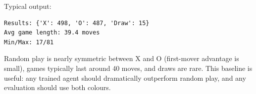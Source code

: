 \begin{Shaded}
\begin{Highlighting}[]
\OperatorTok{=}\NormalTok{ \{}\NormalTok{: }\NormalTok{, }\NormalTok{: }\NormalTok{, }\NormalTok{: }\NormalTok{\}}
\OperatorTok{=}\NormalTok{ []}

 \NormalTok{(}\NormalTok{):}
\OperatorTok{=}\OperatorTok{=}
\OperatorTok{=}  \OperatorTok{==}    \OperatorTok{==} \OperatorTok{{-}}  
\OperatorTok{+=} 

\NormalTok{(}\SpecialCharTok{\{}\SpecialCharTok{\}}\NormalTok{)}
\NormalTok{(}\SpecialCharTok{\{}\OperatorTok{/}\NormalTok{)}
\NormalTok{(}\SpecialCharTok{\{}\SpecialCharTok{\}}\SpecialStringTok{/}\SpecialCharTok{\{}\SpecialCharTok{\}}\NormalTok{)}
\end{Highlighting}
\end{Shaded}

Typical output:

\begin{verbatim}
Results: {'X': 498, 'O': 487, 'Draw': 15}
Avg game length: 39.4 moves
Min/Max: 17/81
\end{verbatim}

Random play is nearly symmetric between X and O (first-mover advantage
is small), games typically last around 40 moves, and draws are rare.
This baseline is useful: any trained agent should dramatically
outperform random play, and any evaluation should use both colours.

